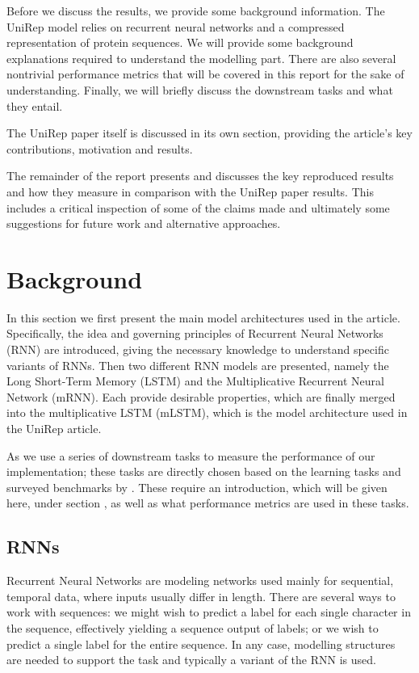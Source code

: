 \documentclass[a4paper,12pt]{article}
\begin{document}
Before we discuss the results, we provide some background information. The UniRep model relies on recurrent neural networks and a compressed representation of protein sequences. We will provide some background explanations required to understand the modelling part. There are also several nontrivial performance metrics that will be covered in this report for the sake of understanding. Finally, we will briefly discuss the downstream tasks and what they entail.

The UniRep paper itself is discussed in its own section, providing the article's key contributions, motivation and results.

The remainder of the report presents and discusses the key reproduced results and how they measure in comparison with the UniRep paper results. This includes a critical inspection of some of the claims made and ultimately some suggestions for future work and alternative approaches.


\clearpage
\section{Background}
\label{section:background}

In this section we first present the main model architectures used in the article. Specifically, the idea and governing principles of Recurrent Neural Networks (RNN) are introduced, giving the necessary knowledge to understand specific variants of RNNs. Then two different RNN models are presented, namely the Long Short-Term Memory (LSTM) and the Multiplicative Recurrent Neural Network (mRNN). Each provide desirable properties, which are finally merged into the multiplicative LSTM (mLSTM), which is the model architecture used in the UniRep article.

As we use a series of downstream tasks to measure the performance of our implementation; these tasks are directly chosen based on the learning tasks and surveyed benchmarks by \cite{rao2019evaluating}. These require an introduction, which will be given here, under section , as well as what performance metrics are used in these tasks.

\subsection{RNNs}
Recurrent Neural Networks are modeling networks used mainly for sequential, temporal data, where inputs usually differ in length. 
There are several ways to work with sequences: we might wish to predict a label for each single character in the sequence, effectively yielding a sequence output of labels; or we wish to predict a single label for the entire sequence. In any case, modelling structures are needed to support the task and typically a variant of the RNN is used.
\end{document}
